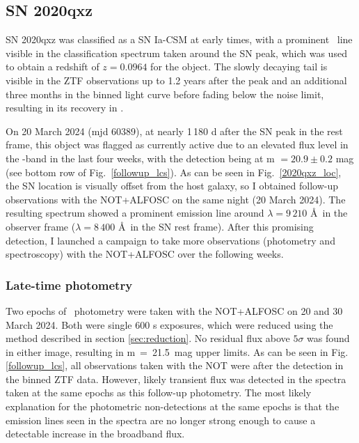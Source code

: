 \documentclass[a4paper,oneside,12pt, class=Latex/Classes/PhDthesisPSnPDF, crop=false]{standalone}
\begin{document}
\subsection{SN 2020qxz}
SN 2020qxz was classified as a SN Ia-CSM at early times, with a prominent \Halpha\ line visible in the classification spectrum taken around the SN peak, which was used to obtain a redshift of $z=0.0964$ for the object. The slowly decaying tail is visible in the ZTF observations up to 1.2 years after the peak and an additional three months in the binned light curve before fading below the noise limit, resulting in its recovery in \citet{Terwel_2024_paper1}.

On 20 March 2024 (mjd 60389), at nearly 1\,180 d after the SN peak in the rest frame, this object was flagged as currently active due to an elevated flux level in the \ztfi-band in the last four weeks, with the detection being at m $=20.9\pm 0.2$ mag (see bottom row of Fig.~\ref{followup_lcs}). As can be seen in Fig.~\ref{2020qxz_loc}, the SN location is visually offset from the host galaxy, so I obtained follow-up observations with the NOT+ALFOSC on the same night (20 March 2024). The resulting spectrum showed a prominent emission line around $\lambda=9\,210$ \AA\ in the observer frame ($\lambda=8\,400$ \AA\ in the SN rest frame). After this promising detection, I launched a campaign to take more observations (photometry and spectroscopy) with the NOT+ALFOSC over the following weeks.


\subsubsection{Late-time photometry}
Two epochs of \ztfi\ photometry were taken with the NOT+ALFOSC on 20 and 30 March 2024. Both were single 600 s exposures, which were reduced using the method described in section \ref{sec:reduction}. No residual flux above $5\sigma$ was found in either image, resulting in m~=~21.5~mag upper limits. As can be seen in Fig. \ref{followup_lcs}, all observations taken with the NOT were after the detection in the binned ZTF data. However, likely transient flux was detected in the spectra taken at the same epochs as this follow-up photometry. The most likely explanation for the photometric non-detections at the same epochs is that the emission lines seen in the spectra are no longer strong enough to cause a detectable increase in the broadband flux. 
\end{document}
